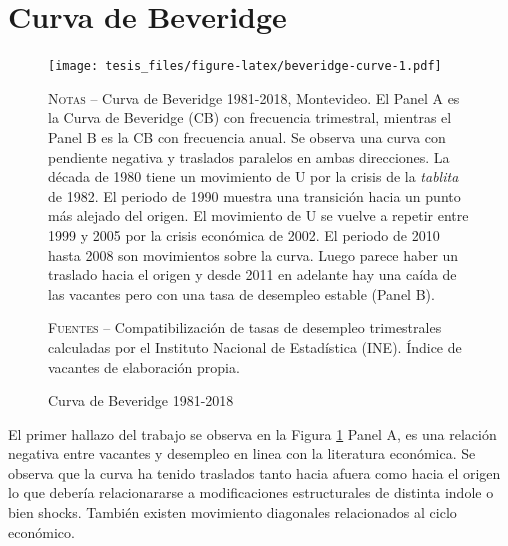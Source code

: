 \documentclass[12pt,oneside]{reedthesis}
\begin{document}
\hypertarget{curva-de-beveridge}{%
\section{Curva de Beveridge}\label{curva-de-beveridge}}
\begin{figure}
\texttt{[image: tesis\_files/figure-latex/beveridge-curve-1.pdf]}
\caption{Curva de Beveridge 1981-2018}\label{fig:beveridge-curve}\textsc{}

\footnotesize\textsc{Notas} -- Curva de Beveridge 1981-2018, Montevideo. El Panel A es la Curva de Beveridge (CB) con frecuencia trimestral, mientras el Panel B es la CB con frecuencia anual. Se observa una curva con pendiente negativa y traslados paralelos en ambas direcciones. La década de 1980 tiene un movimiento de U por la crisis de la \textit{tablita} de 1982. El periodo de 1990 muestra una transición hacia un punto más alejado del origen. El movimiento de U se vuelve a repetir entre 1999 y 2005 por la crisis económica de 2002. El periodo de 2010 hasta 2008 son movimientos sobre la curva. Luego parece haber un traslado hacia el origen y desde 2011 en adelante hay una caída de las vacantes pero con una tasa de desempleo estable (Panel B).

\textsc{Fuentes} -- Compatibilización de tasas de desempleo trimestrales calculadas por el Instituto Nacional de Estadística (INE). Índice de vacantes de elaboración propia.
\end{figure}
El primer hallazo del trabajo se observa en la Figura \ref{fig:beveridge-curve} Panel A, es una relación negativa entre vacantes y desempleo en linea con la literatura económica. Se observa que la curva ha tenido traslados tanto hacia afuera como hacia el origen lo que debería relacionararse a modificaciones estructurales de distinta indole o bien shocks. También existen movimiento diagonales relacionados al ciclo económico.
\end{document}
